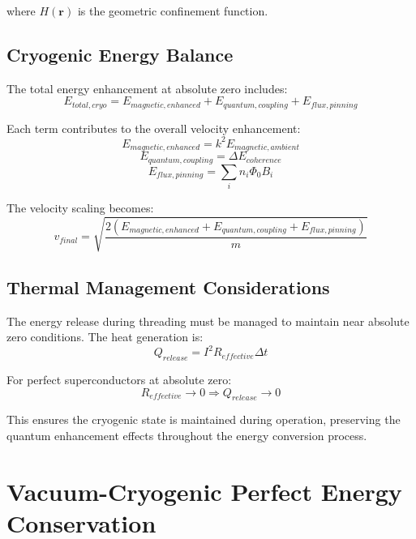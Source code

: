 \documentclass[12pt,a4paper]{article}
\begin{document}
where $H(\mathbf{r})$ is the geometric confinement function.

\subsection{Cryogenic Energy Balance}

The total energy enhancement at absolute zero includes:
\begin{equation}
E_{total,cryo} = E_{magnetic,enhanced} + E_{quantum,coupling} + E_{flux,pinning}
\end{equation}

Each term contributes to the overall velocity enhancement:
\begin{equation}
E_{magnetic,enhanced} = k^2 E_{magnetic,ambient}
\end{equation}
\begin{equation}
E_{quantum,coupling} = \Delta E_{coherence}
\end{equation}
\begin{equation}
E_{flux,pinning} = \sum_i n_i \Phi_0 B_i
\end{equation}

The velocity scaling becomes:
\begin{equation}
v_{final} = \sqrt{\frac{2(E_{magnetic,enhanced} + E_{quantum,coupling} + E_{flux,pinning})}{m}}
\end{equation}

\subsection{Thermal Management Considerations}

The energy release during threading must be managed to maintain near absolute zero conditions. The heat generation is:
\begin{equation}
Q_{release} = I^2 R_{effective} \Delta t
\end{equation}

For perfect superconductors at absolute zero:
\begin{equation}
R_{effective} \rightarrow 0 \Rightarrow Q_{release} \rightarrow 0
\end{equation}

This ensures the cryogenic state is maintained during operation, preserving the quantum enhancement effects throughout the energy conversion process.

\section{Vacuum-Cryogenic Perfect Energy Conservation}
\end{document}

